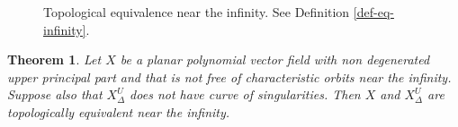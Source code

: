 \documentclass[12pt]{amsart}
\newtheorem{mtheorem}{Theorem}
\begin{document}
\begin{figure}[h]
\caption{\footnotesize{Topological equivalence near the infinity. See Definition \ref{def-eq-infinity}.}}
\label{fig-eq-infinity}
\end{figure}

\begin{mtheorem}\label{main-theorem}
Let $X$ be a planar polynomial vector field with non degenerated upper principal part and that is not free of characteristic orbits near the infinity. Suppose also that  $X_{\Delta}^{U}$ does not have curve of singularities. Then $X$ and $X_{\Delta}^{U}$ are topologically equivalent near the infinity.
\end{mtheorem}
\end{document}
